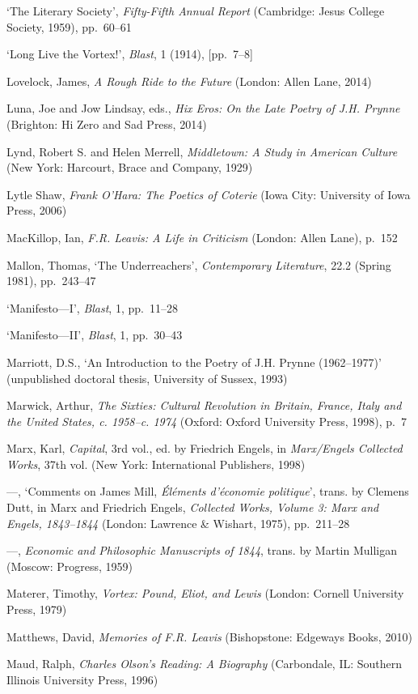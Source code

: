 \documentclass[]{article}
\begin{document}
`The Literary Society', \emph{Fifty-Fifth Annual Report} (Cambridge:
Jesus College Society, 1959), pp.~60--61

`Long Live the Vortex!', \emph{Blast}, 1 (1914), {[}pp.~7--8{]}

Lovelock, James, \emph{A Rough Ride to the Future} (London: Allen Lane,
2014)

Luna, Joe and Jow Lindsay, eds., \emph{Hix Eros: On the Late Poetry of
J.H. Prynne} (Brighton: Hi Zero and Sad Press, 2014)

Lynd, Robert S. and Helen Merrell, \emph{Middletown: A Study in American
Culture} (New York: Harcourt, Brace and Company, 1929)

Lytle Shaw, \emph{Frank O'Hara: The Poetics of Coterie} (Iowa City:
University of Iowa Press, 2006)

MacKillop, Ian, \emph{F.R. Leavis: A Life in Criticism} (London: Allen
Lane), p.~152

Mallon, Thomas, `The Underreachers', \emph{Contemporary Literature},
22.2 (Spring 1981), pp.~243--47

`Manifesto---I', \emph{Blast}, 1, pp.~11--28

`Manifesto---II', \emph{Blast}, 1, pp.~30--43

Marriott, D.S., `An Introduction to the Poetry of J.H. Prynne
(1962--1977)' (unpublished doctoral thesis, University of Sussex, 1993)

Marwick, Arthur, \emph{The Sixties: Cultural Revolution in Britain,
France, Italy and the United States, c. 1958--c. 1974} (Oxford: Oxford
University Press, 1998), p.~7

Marx, Karl, \emph{Capital}, 3rd vol., ed. by Friedrich Engels, in
\emph{Marx/Engels Collected Works}, 37th vol. (New York: International
Publishers, 1998)

---, `Comments on James Mill, \emph{Éléments d'économie politique}',
trans. by Clemens Dutt, in Marx and Friedrich Engels, \emph{Collected
Works, Volume 3: Marx and Engels, 1843--1844} (London: Lawrence \&
Wishart, 1975), pp.~211--28

---, \emph{Economic and Philosophic Manuscripts of 1844}, trans. by
Martin Mulligan (Moscow: Progress, 1959)

Materer, Timothy, \emph{Vortex: Pound, Eliot, and Lewis} (London:
Cornell University Press, 1979)

Matthews, David, \emph{Memories of F.R. Leavis} (Bishopstone: Edgeways
Books, 2010)

Maud, Ralph, \emph{Charles Olson's Reading: A Biography} (Carbondale,
IL: Southern Illinois University Press, 1996)
\end{document}
